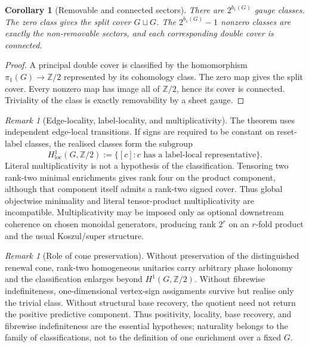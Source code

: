 \documentclass[11pt]{article}
\newtheorem{corollary}[theorem]{Corollary}
\theoremstyle{definition}
\theoremstyle{remark}
\newtheorem{remark}[theorem]{Remark}
\newcommand{\Z}{\mathbb{Z}}
\begin{document}
\begin{corollary}[Removable and connected sectors]
\label{cor:sector-count}
There are \(2^{b_1(G)}\) gauge classes.  The zero class gives the split cover
\(G\sqcup G\).  The \(2^{b_1(G)}-1\) nonzero classes are exactly the
non-removable sectors, and each corresponding double cover is connected.
\end{corollary}

\begin{proof}
A principal double cover is classified by the homomorphism
\(\pi_1(G)\to\Z/2\) represented by its cohomology class.  The zero map gives the
split cover.  Every nonzero map has image all of \(\Z/2\), hence its cover is
connected.  Triviality of the class is exactly removability by a sheet gauge.
\end{proof}

\begin{remark}[Edge-locality, label-locality, and multiplicativity]
\label{rem:locality-multiplicativity}
The theorem uses independent edge-local transitions.  If signs are required to
be constant on reset-label classes, the realised classes form the subgroup
\[
 H^1_{\mathrm{loc}}(G,\Z/2)
 :=\{[c]:c\text{ has a label-local representative}\}.
\]
Literal multiplicativity is not a hypothesis of the classification.  Tensoring
two rank-two minimal enrichments gives rank four on the product component,
although that component itself admits a rank-two signed cover.  Thus global
objectwise minimality and literal tensor-product multiplicativity are
incompatible.  Multiplicativity may be imposed only as optional downstream
coherence on chosen monoidal generators, producing rank \(2^r\) on an
\(r\)-fold product and the usual Koszul/super structure.
\end{remark}

\begin{remark}[Role of cone preservation]
\label{rem:positivity-load-bearing}
Without preservation of the distinguished renewal cone, rank-two homogeneous
unitaries carry arbitrary phase holonomy and the classification enlarges beyond
\(H^1(G,\Z/2)\).  Without fibrewise indefiniteness, one-dimensional vertex-sign
assignments survive but realise only the trivial class.  Without structural base
recovery, the quotient need not return the positive predictive component.
Thus positivity, locality, base recovery, and fibrewise indefiniteness are the
essential hypotheses; naturality belongs to the family of classifications,
not to the definition of one enrichment over a fixed \(G\).
\end{remark}
\end{document}
